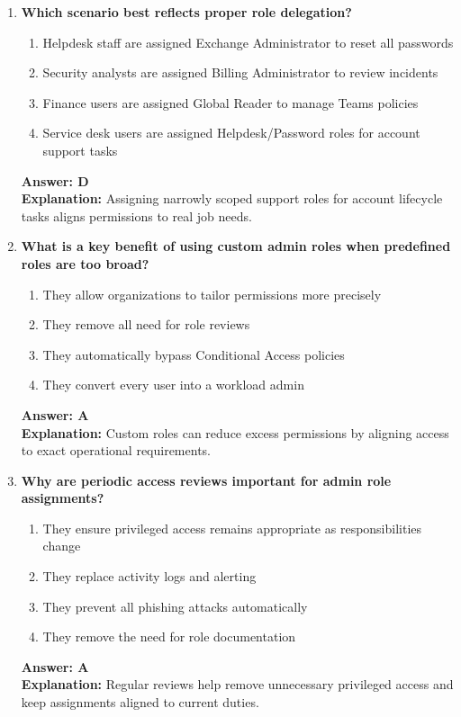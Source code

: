 \documentclass[10pt]{article}
\begin{document}
\begin{enumerate}[leftmargin=*]
\item \textbf{Which scenario best reflects proper role delegation?}
\begin{enumerate}[label=\Alph*.]
  \item Helpdesk staff are assigned Exchange Administrator to reset all passwords
  \item Security analysts are assigned Billing Administrator to review incidents
  \item Finance users are assigned Global Reader to manage Teams policies
  \item Service desk users are assigned Helpdesk/Password roles for account support tasks
\end{enumerate}
\textbf{Answer: D}\\
\textbf{Explanation:} Assigning narrowly scoped support roles for account lifecycle tasks aligns permissions to real job needs.

\item \textbf{What is a key benefit of using custom admin roles when predefined roles are too broad?}
\begin{enumerate}[label=\Alph*.]
  \item They allow organizations to tailor permissions more precisely
  \item They remove all need for role reviews
  \item They automatically bypass Conditional Access policies
  \item They convert every user into a workload admin
\end{enumerate}
\textbf{Answer: A}\\
\textbf{Explanation:} Custom roles can reduce excess permissions by aligning access to exact operational requirements.

\item \textbf{Why are periodic access reviews important for admin role assignments?}
\begin{enumerate}[label=\Alph*.]
  \item They ensure privileged access remains appropriate as responsibilities change
  \item They replace activity logs and alerting
  \item They prevent all phishing attacks automatically
  \item They remove the need for role documentation
\end{enumerate}
\textbf{Answer: A}\\
\textbf{Explanation:} Regular reviews help remove unnecessary privileged access and keep assignments aligned to current duties.


\end{enumerate}
\end{document}
